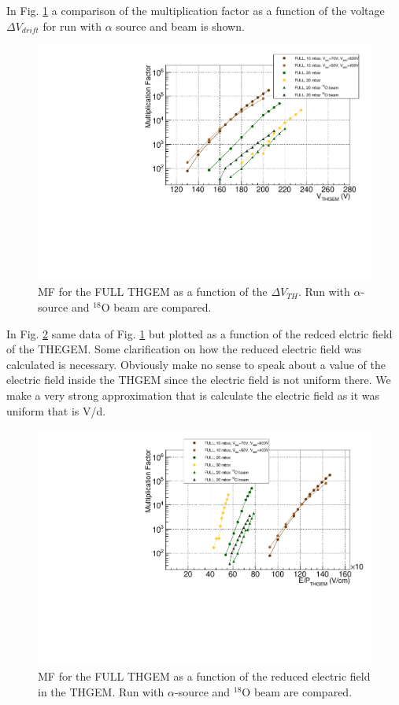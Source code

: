 \documentclass[a4paper, 11 pt]{report}
\newcommand{\Vthgem}{$\Delta V_{TH}$}
\newcommand{\Vdrift}{$ \Delta V_{drift}$}
\begin{document}
  In Fig. \ref{fig:MF_FULL_beam} a comparison of the multiplication factor as a function of the
  voltage \Vdrift{} for run with $\alpha$ source and beam is shown. 
  \begin{figure}[htbp]
	\centering
	\includegraphics[width=\textwidth]{Immagini/MF_FULL_THGEM_withBeam.pdf}
	\caption{MF for the FULL THGEM as a function of the \Vthgem{}. Run with $\alpha$-source
	and $^{18}$O beam are compared. }
	\label{fig:MF_FULL_beam}
  \end{figure}
  In Fig. \ref{fig:MF_FULL_beam_F} same data of Fig. \ref{fig:MF_FULL_beam} but plotted as a 
  function of the redced elctric field of the THEGEM. Some clarification on how the reduced 
  electric field was calculated is necessary. Obviously make no sense to speak about a value of 
  the electric field inside the THGEM since the electric field is not uniform there. We make a very
  strong approximation that is calculate the electric field as it was uniform that is V/d.
  \begin{figure}[htbp]
	\centering
	\includegraphics[width=\textwidth]{Immagini/MF_FULL_THGEM_withBeam_F.pdf}
	\caption{MF for the FULL THGEM as a function of the reduced electric field in the THGEM. Run 
	with $\alpha$-source and $^{18}$O beam are compared.}
	\label{fig:MF_FULL_beam_F}
  \end{figure}
  
\end{document}
